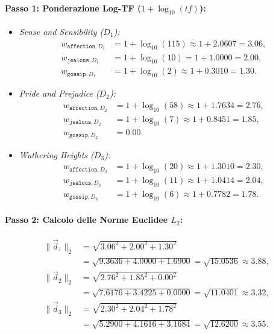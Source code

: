 \paragraph{Passo 1: Ponderazione Log-TF ($1 + \log_{10}(tf)$):}
\begin{itemize}
    \item \textit{Sense and Sensibility ($D_1$):}
    \begin{align*}
    w_{\texttt{affection}, D_1} &= 1 + \log_{10}(115) \approx 1 + 2.0607 = \mathbf{3.06}, \\
    w_{\texttt{jealous}, D_1}   &= 1 + \log_{10}(10) = 1 + 1.0000 = \mathbf{2.00}, \\
    w_{\texttt{gossip}, D_1}    &= 1 + \log_{10}(2) \approx 1 + 0.3010 = \mathbf{1.30}.
    \end{align*}
    \item \textit{Pride and Prejudice ($D_2$):}
    \begin{align*}
    w_{\texttt{affection}, D_2} &= 1 + \log_{10}(58) \approx 1 + 1.7634 = \mathbf{2.76}, \\
    w_{\texttt{jealous}, D_2}   &= 1 + \log_{10}(7) \approx 1 + 0.8451 = \mathbf{1.85}, \\
    w_{\texttt{gossip}, D_2}    &= \mathbf{0.00}.
    \end{align*}
    \item \textit{Wuthering Heights ($D_3$):}
    \begin{align*}
    w_{\texttt{affection}, D_3} &= 1 + \log_{10}(20) \approx 1 + 1.3010 = \mathbf{2.30}, \\
    w_{\texttt{jealous}, D_3}   &= 1 + \log_{10}(11) \approx 1 + 1.0414 = \mathbf{2.04}, \\
    w_{\texttt{gossip}, D_3}    &= 1 + \log_{10}(6) \approx 1 + 0.7782 = \mathbf{1.78}.
    \end{align*}
\end{itemize}

\paragraph{Passo 2: Calcolo delle Norme Euclidee $L_2$:}
\begin{align}
\|\vec{d}_1\|_2 &= \sqrt{3.06^2 + 2.00^2 + 1.30^2} \nonumber \\
                &= \sqrt{9.3636 + 4.0000 + 1.6900} = \sqrt{15.0536} \approx \mathbf{3.88}, \\
\|\vec{d}_2\|_2 &= \sqrt{2.76^2 + 1.85^2 + 0.00^2} \nonumber \\
                &= \sqrt{7.6176 + 3.4225 + 0.0000} = \sqrt{11.0401} \approx \mathbf{3.32}, \\
\|\vec{d}_3\|_2 &= \sqrt{2.30^2 + 2.04^2 + 1.78^2} \nonumber \\
                &= \sqrt{5.2900 + 4.1616 + 3.1684} = \sqrt{12.6200} \approx \mathbf{3.55}.
\end{align}

